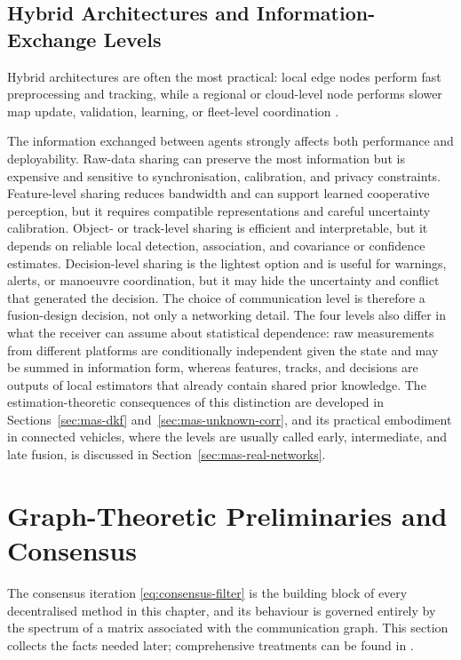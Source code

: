\documentclass[graybox,envcountchap]{style/SNmono}
\begin{document}
\subsection{Hybrid Architectures and Information-Exchange Levels}
\label{subsec:mas-levels}

Hybrid architectures are often the most practical: local edge nodes perform fast preprocessing and tracking, while a regional or cloud-level node performs slower map update, validation, learning, or fleet-level coordination \cite{deng_edge_2021,lim_federated_2020}.

The information exchanged between agents strongly affects both performance and deployability. Raw-data sharing can preserve the most information but is expensive and sensitive to synchronisation, calibration, and privacy constraints. Feature-level sharing reduces bandwidth and can support learned cooperative perception, but it requires compatible representations and careful uncertainty calibration. Object- or track-level sharing is efficient and interpretable, but it depends on reliable local detection, association, and covariance or confidence estimates. Decision-level sharing is the lightest option and is useful for warnings, alerts, or manoeuvre coordination, but it may hide the uncertainty and conflict that generated the decision. The choice of communication level is therefore a fusion-design decision, not only a networking detail. The four levels also differ in what the receiver can assume about statistical dependence: raw measurements from different platforms are conditionally independent given the state and may be summed in information form, whereas features, tracks, and decisions are outputs of local estimators that already contain shared prior knowledge. The estimation-theoretic consequences of this distinction are developed in Sections~\ref{sec:mas-dkf} and~\ref{sec:mas-unknown-corr}, and its practical embodiment in connected vehicles, where the levels are usually called early, intermediate, and late fusion, is discussed in Section~\ref{sec:mas-real-networks}.

\section{Graph-Theoretic Preliminaries and Consensus}
\label{sec:mas-graph-theory}

The consensus iteration \eqref{eq:consensus-filter} is the building block of every decentralised method in this chapter, and its behaviour is governed entirely by the spectrum of a matrix associated with the communication graph. This section collects the facts needed later; comprehensive treatments can be found in \cite{olfatisaber2007_consensus,ren2005_consensus}.
\end{document}
